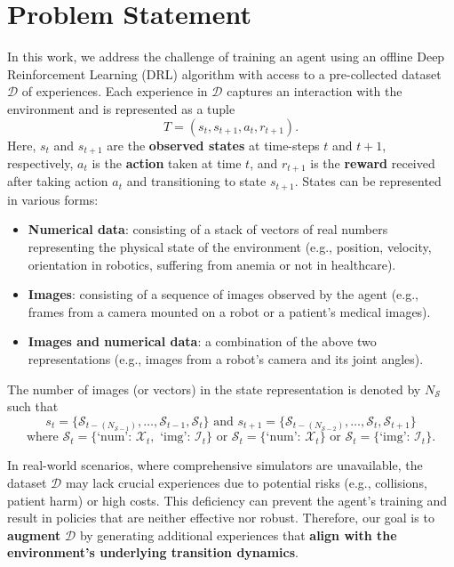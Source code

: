 \section{Problem Statement}

In this work, we address the challenge of training an agent using
an offline Deep Reinforcement Learning (DRL) algorithm with access 
to a pre-collected dataset \( \mathcal{D} \) of experiences. 
Each experience in \( \mathcal{D} \) captures an interaction with
the environment and is represented as a tuple
\[ T = (s_t, s_{t+1}, a_t, r_{t+1}) .\] Here, \( s_t \)
and \( s_{t+1} \) are the \textbf{observed states} at time-steps
\( t \) and \( t+1 \), respectively, \( a_t \) is the \textbf{action}
taken at time \( t \), and \( r_{t+1} \) is the \textbf{reward} received
after taking action \( a_t \) and transitioning to state \( s_{t+1} \).
States can be represented in various forms:
\begin{itemize}
    \item \textbf{Numerical data}: consisting of a stack of vectors of
    real numbers representing the physical state of the environment
    (e.g., position, velocity, orientation in robotics,
    suffering from anemia or not in healthcare).
    \item \textbf{Images}: consisting of a sequence of images
    observed by the agent (e.g., frames from a camera mounted on a
    robot or a patient's medical images).
    \item \textbf{Images and numerical data}: a combination of the
    above two representations (e.g., images from a robot's camera
    and its joint angles).
\end{itemize}
The number of images (or vectors) in the state representation
is denoted by \( N_{\mathcal{S}} \) such that
\[ s_t = \{ \mathcal{S}_{t-(N_{\mathcal{S}-1})}, \ldots,
\mathcal{S}_{t-1}, \mathcal{S}_t \} \text{  and  }
s_{t+1} = \{ \mathcal{S}_{t-(N_{\mathcal{S}-2})}, \ldots,
\mathcal{S}_t, \mathcal{S}_{t+1} \} \]
\[
    \text{where } \mathcal{S}_t =
    \{\text{`num': } \mathcal{X}_t, \text{ `img': } \mathcal{I}_t\} \text{ or }
    \mathcal{S}_t = \{\text{`num': } \mathcal{X}_t\}
    \text{ or } \mathcal{S}_t = \{\text{`img': } \mathcal{I}_t\}.
\]

In real-world scenarios, where comprehensive simulators are unavailable,
the dataset \( \mathcal{D} \) may lack crucial experiences due
to potential risks (e.g., collisions, patient harm) or high costs.
This deficiency can prevent the agent's training and result in policies
that are neither effective nor robust. Therefore, our goal is to \textbf{augment}
\( \mathcal{D} \) by generating additional experiences that
\textbf{align with the environment's underlying transition dynamics}.

